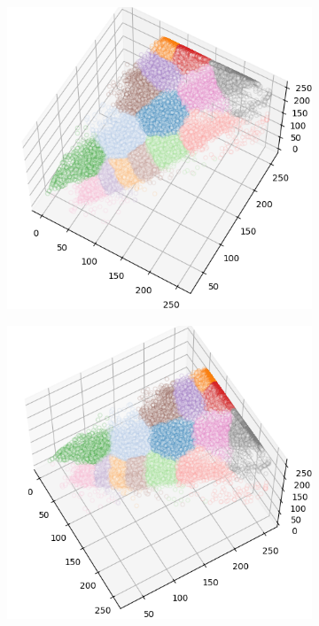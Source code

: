 \begin{figure}[htbp]
\begin{subfigure}[t]{0.32\textwidth}
    \end{subfigure}
    \begin{subfigure}[t]{0.32\textwidth}
        \includegraphics[width=\linewidth]{../../python_code/plots/kmeans/cat-101/clusters_elev60_azim-60.png}
    \end{subfigure}
    \begin{subfigure}[t]{0.32\textwidth}
        \includegraphics[width=\linewidth]{../../python_code/plots/kmeans/cat-101/clusters_elev60_azim-30.png}

\end{subfigure}
\end{figure}
